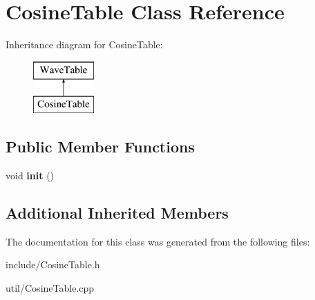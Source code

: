 \hypertarget{classCosineTable}{}\section{Cosine\+Table Class Reference}
\label{classCosineTable}
Inheritance diagram for Cosine\+Table\+:\begin{figure}[H]
\begin{center}
\leavevmode
\includegraphics[height=2.000000cm]{classCosineTable}
\end{center}
\end{figure}
\subsection*{Public Member Functions}
\begin{DoxyCompactItemize}
\item 
void {\bfseries init} ()\hypertarget{classCosineTable_aa44f664688eca2ff8de26b2ee5d78785}{}\label{classCosineTable_aa44f664688eca2ff8de26b2ee5d78785}

\end{DoxyCompactItemize}
\subsection*{Additional Inherited Members}


The documentation for this class was generated from the following files\+:\begin{DoxyCompactItemize}
\item 
include/Cosine\+Table.\+h\item 
util/Cosine\+Table.\+cpp\end{DoxyCompactItemize}
